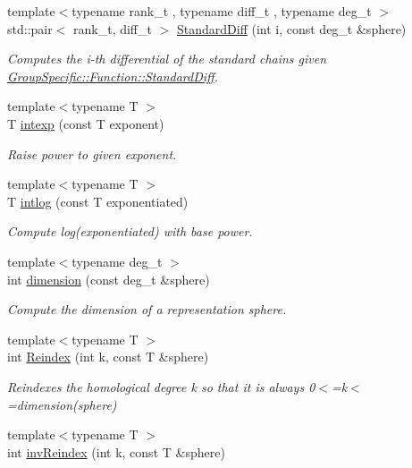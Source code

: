 \begin{DoxyCompactItemize}
{\footnotesize template$<$typename rank\+\_\+t , typename diff\+\_\+t , typename deg\+\_\+t $>$ }\\std\+::pair$<$ rank\+\_\+t, diff\+\_\+t $>$ \hyperlink{namespaceMackey_a4b31e1685ed5771bcced308b3b13c7f0}{Standard\+Diff} (int i, const deg\+\_\+t \&sphere)
\begin{DoxyCompactList}\small\item\em Computes the i-\/th differential of the standard chains given \hyperlink{classGroupSpecific_1_1Function_a8ead55e2f2e2bbda4deea3964793498d}{Group\+Specific\+::\+Function\+::\+Standard\+Diff}. \end{DoxyCompactList}\item 
{\footnotesize template$<$typename T $>$ }\\T \hyperlink{namespaceMackey_a4904fdc0fdcf3c23d7f3b80f59b2eafa}{intexp} (const T exponent)
\begin{DoxyCompactList}\small\item\em Raise power to given exponent. \end{DoxyCompactList}\item 
{\footnotesize template$<$typename T $>$ }\\T \hyperlink{namespaceMackey_aa0cac9097035c5fe8448742e22e6f78b}{intlog} (const T exponentiated)
\begin{DoxyCompactList}\small\item\em Compute log(exponentiated) with base power. \end{DoxyCompactList}\item 
{\footnotesize template$<$typename deg\+\_\+t $>$ }\\int \hyperlink{namespaceMackey_a6a5d40e69e5628ea84896ee43f4a91fa}{dimension} (const deg\+\_\+t \&sphere)
\begin{DoxyCompactList}\small\item\em Compute the dimension of a representation sphere. \end{DoxyCompactList}\item 
{\footnotesize template$<$typename T $>$ }\\int \hyperlink{namespaceMackey_acb84c147d9ee39eac2883a762e3710dd}{Reindex} (int k, const T \&sphere)
\begin{DoxyCompactList}\small\item\em Reindexes the homological degree k so that it is always 0$<$=k$<$=dimension(sphere) \end{DoxyCompactList}\item 
{\footnotesize template$<$typename T $>$ }\\int \hyperlink{namespaceMackey_a011b8e23bc2eedf751a9ce7bdc9e4cb9}{inv\+Reindex} (int k, const T \&sphere)

\end{DoxyCompactItemize}
